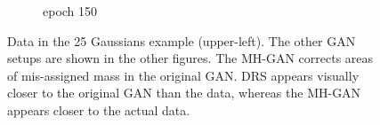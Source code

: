\begin{figure}[htbp]
\begin{subfigure}[b]{0.49\textwidth}
       \caption{epoch 150}
    \end{subfigure}
    \caption{{\small
    Data in the 25 Gaussians example (upper-left)\@.
    The other GAN setups are shown in the other figures.
    The MH-GAN corrects areas of mis-assigned mass in the original GAN\@.
    DRS appears visually closer to the original GAN than the data, whereas the MH-GAN appears closer to the actual data.
    }}
    \label{fig:mog_example}
\end{figure}

